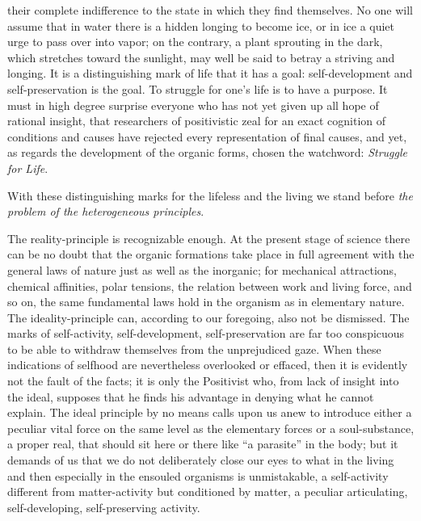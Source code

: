 \documentclass[12pt]{article}
\begin{document}
their complete indifference to the state in which they find themselves. No
one will assume that in water there is a hidden longing to become ice, or in
ice a quiet urge to pass over into vapor; on the contrary, a plant sprouting
in the dark, which stretches toward the sunlight, may well be said to betray
a striving and longing. It is a distinguishing mark of life that it has a
goal: self-development and self-preservation is the goal. To struggle for
one's life is to have a purpose. It must in high degree surprise everyone who
has not yet given up all hope of rational insight, that researchers of
positivistic zeal for an exact cognition of conditions and causes have
rejected every representation of final causes, and yet, as regards the
development of the organic forms, chosen the watchword: \emph{Struggle for
Life}.

With these distinguishing marks for the lifeless and the living we stand
before \emph{the problem of the heterogeneous principles}.

The reality-principle is recognizable enough. At the present stage of
science there can be no doubt that the organic formations take place in full
agreement with the general laws of nature just as well as the inorganic; for
mechanical attractions, chemical affinities, polar tensions, the relation
between work and living force, and so on, the same fundamental laws hold in
the organism as in elementary nature. The ideality-principle can, according
to our foregoing, also not be dismissed. The marks of self-activity,
self-development, self-preservation are far too conspicuous to be able to
withdraw themselves from the unprejudiced gaze. When these indications of
selfhood are nevertheless overlooked or effaced, then it is evidently not
the fault of the facts; it is only the Positivist who, from lack of insight
into the ideal,
supposes that he finds his advantage in denying what he cannot explain. The
ideal principle by no means calls upon us anew to introduce either a
peculiar vital force on the same level as the elementary forces or a
soul-substance, a proper real, that should sit here or there like ``a
parasite'' in the body; but it demands of us that we do not deliberately
close our eyes to what in the living and then especially in the ensouled
organisms is unmistakable, a self-activity different from matter-activity
but conditioned by matter, a peculiar articulating, self-developing,
self-preserving activity.
\end{document}
